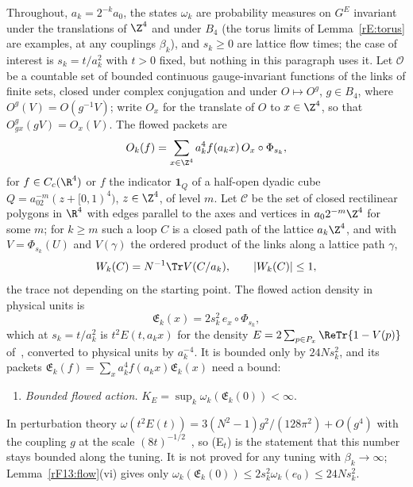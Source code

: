 Throughout, $a_k=2^{-k}a_0$, the states $\omega_k$ are probability measures on
$G^E$ invariant under the translations of $\Z^4$ and under $B_4$ (the torus
limits of Lemma~\ref{rE:torus} are examples, at any couplings $\beta_k$), and
$s_k\ge0$ are lattice flow times; the case of interest is $s_k=t/a_k^2$ with
$t>0$ fixed, but nothing in this paragraph uses it. Let $\mathcal O$ be a
countable set of bounded continuous gauge-invariant functions of the links
of finite sets, closed under complex conjugation and under $O\mapsto O^g$,
$g\in B_4$, where $O^g(V)=O(g^{-1}V)$; write $O_x$ for the translate of $O$
to $x\in\Z^4$, so that $O^g_{gx}(gV)=O_x(V)$. The flowed packets are
\[
O_k(f)=\sum_{x\in\Z^4}a_k^4f(a_kx)\,O_x\circ\Phi_{s_k},
\]
for $f\in C_c(\R^4)$ or $f$ the indicator $\mathbf 1_Q$ of a half-open dyadic
cube $Q=a_02^{-m}(z+[0,1)^4)$, $z\in\Z^4$, of level $m$. Let $\mathcal C$ be
the set of closed rectilinear polygons in $\R^4$ with edges parallel to the
axes and vertices in $a_02^{-m}\Z^4$ for some $m$; for $k\ge m$ such a loop $C$
is a closed path of the lattice $a_k\Z^4$, and with $V=\Phi_{s_k}(U)$ and
$V(\gamma)$ the ordered product of the links along a lattice path $\gamma$,
\[
W_k(C)=N^{-1}\Tr V(C/a_k),\qquad|W_k(C)|\le1 ,
\]
the trace not depending on the starting point. The flowed action density in
physical units is
\[
\mathfrak E_k(x)=2s_k^2\,e_x\circ\Phi_{s_k},
\]
which at $s_k=t/a_k^2$ is $t^2E(t,a_kx)$ for the density $E=2\sum_{p\in
P_x}\ReTr\{1-V(p)\}$ of~\cite[(3.1)]{Lus10}, converted to physical units by
$a_k^{-4}$. It is bounded only by $24Ns_k^2$, and its packets
$\mathfrak E_k(f)=\sum_xa_k^4f(a_kx)\mathfrak E_k(x)$ need a bound:
\begin{enumerate}[label=\textup{(E$_t$)},leftmargin=*]
\item \emph{Bounded flowed action.} $K_E=\sup_k\omega_k(\mathfrak E_k(0))
<\infty$.
\end{enumerate}
In perturbation theory $\omega(t^2E(t))=3(N^2-1)g^2/(128\pi^2)+O(g^4)$ with
the coupling $g$ at the scale $(8t)^{-1/2}$~\cite[(2.32)]{Lus10}, so (E$_t$)
is the statement that this number stays bounded along the tuning. It is not
proved for any tuning with $\beta_k\to\infty$; Lemma~\ref{rF13:flow}(vi)
gives only $\omega_k(\mathfrak E_k(0))\le2s_k^2\omega_k(e_0)\le24Ns_k^2$.

